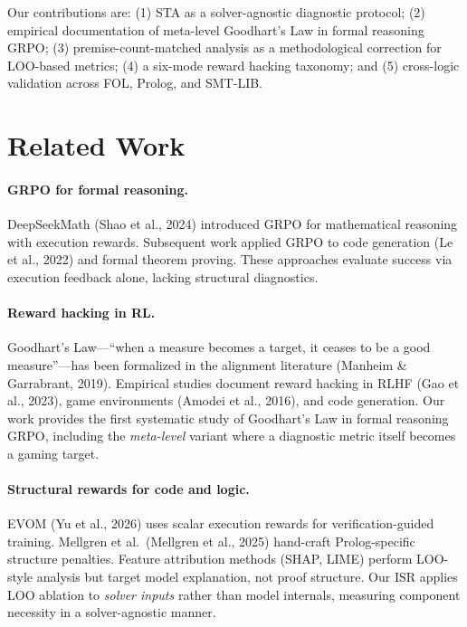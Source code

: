 \documentclass[11pt,a4paper]{article}
\begin{document}
Our contributions are: (1) STA as a solver-agnostic diagnostic protocol; (2) empirical documentation of meta-level Goodhart's Law in formal reasoning GRPO; (3) premise-count-matched analysis as a methodological correction for LOO-based metrics; (4) a six-mode reward hacking taxonomy; and (5) cross-logic validation across FOL, Prolog, and SMT-LIB.

\section{Related Work}
\label{sec:related}

\paragraph{GRPO for formal reasoning.}
DeepSeekMath (Shao et al., 2024) introduced GRPO for mathematical reasoning with execution rewards.
Subsequent work applied GRPO to code generation (Le et al., 2022) and formal theorem proving.
These approaches evaluate success via execution feedback alone, lacking structural diagnostics.

\paragraph{Reward hacking in RL.}
Goodhart's Law---``when a measure becomes a target, it ceases to be a good measure''---has been formalized in the alignment literature (Manheim \& Garrabrant, 2019).
Empirical studies document reward hacking in RLHF (Gao et al., 2023), game environments (Amodei et al., 2016), and code generation.
Our work provides the first systematic study of Goodhart's Law in formal reasoning GRPO, including the \emph{meta-level} variant where a diagnostic metric itself becomes a gaming target.

\paragraph{Structural rewards for code and logic.}
EVOM (Yu et al., 2026) uses scalar execution rewards for verification-guided training.
Mellgren et al.\ (Mellgren et al., 2025) hand-craft Prolog-specific structure penalties.
Feature attribution methods (SHAP, LIME) perform LOO-style analysis but target model explanation, not proof structure.
Our ISR applies LOO ablation to \emph{solver inputs} rather than model internals, measuring component necessity in a solver-agnostic manner.
\end{document}

